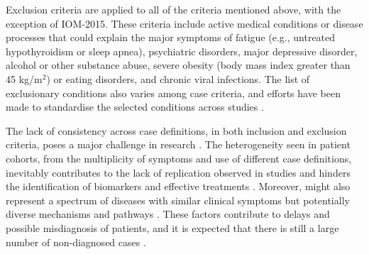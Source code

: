 Exclusion criteria are applied to all of the criteria mentioned above, with the exception of IOM-2015.
These criteria include active medical conditions or disease processes that could explain the major symptoms of fatigue (e.g., untreated hypothyroidism or sleep apnea), psychiatric disorders, major depressive disorder, alcohol or other substance abuse, severe obesity (body mass index greater than 45 kg/m${^2}$) or eating disorders, and chronic viral infections.
The list of exclusionary conditions also varies among case criteria, and efforts have been made to standardise the selected conditions across studies \citep{jason2023EstablishingConsensus}.



The lack of consistency across case definitions, in both inclusion and exclusion criteria, poses a major challenge in \cfs research \citep{jason2014ExaminingCase, nacul2017DifferingCase}.
The heterogeneity seen in patient cohorts, from the multiplicity of symptoms and use of different case definitions, inevitably contributes to the lack of replication observed in studies and hinders the identification of biomarkers and effective treatments \citep{nacul2019HowHave, malato2021Statisticalchallenges, malato2023ImpactMisdiagnosis}. Moreover, \cfs might also represent a spectrum of diseases with similar clinical symptoms but potentially diverse mechanisms and pathways \citep{jason2005ChronicFatigue}. These factors contribute to delays and possible misdiagnosis of patients, and it is expected that there is still a large number of non-diagnosed cases \citep{solomon2004FactorsInfluencing, bayliss2014OvercomingBarriers}.

